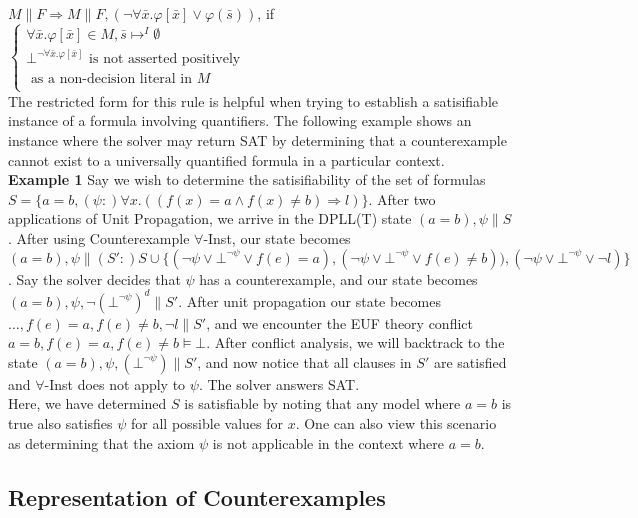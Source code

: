 \documentclass{llncs}
\begin{document}
$M \parallel F \Longrightarrow M \parallel F, (\neg \forall \bar{x}. \varphi[ \bar{ x } ] \vee \varphi( \bar{ s } ))$, if   
$\begin{cases}
  \forall \bar{x}. \varphi[ \bar{ x } ] \in M, \bar{ s } \mapsto^I \emptyset \\
  \bot^{\neg \forall \bar{x}. \varphi[ \bar{ x } ]} \text{ is not asserted positively }\\
  \text{ \ \ \ as a non-decision literal in $M$ } \\    
\end{cases}$ \\

The restricted form for this rule is helpful when trying to establish a satisifiable instance of a formula involving quantifiers.
The following example shows an instance where the solver may return SAT by determining that a counterexample cannot exist to a universally quantified formula in a particular context. \\

{\bf Example 1}
Say we wish to determine the satisifiability of the set of formulas $S = \{ a = b, (\psi :) \forall x. ((f(x) = a \wedge f(x) \neq b) \Rightarrow l) \}$.
After two applications of Unit Propagation, we arrive in the DPLL(T) state $( a = b ), \psi \parallel S$.
After using Counterexample $\forall$-Inst, our state becomes $( a = b ), \psi \parallel (S':) S \cup \{ (\neg \psi \vee \bot^{\neg \psi} \vee f( e ) = a), (\neg \psi \vee \bot^{\neg \psi} \vee f( e ) \neq b)), (\neg \psi \vee \bot^{\neg \psi} \vee \neg l) \}$.
Say the solver decides that $\psi$ has a counterexample, and our state becomes $( a = b ), \psi, \neg (\bot^{\neg \psi})^d \parallel S'$. 
After unit propagation our state becomes $\ldots, f( e ) = a, f( e ) \neq b, \neg l \parallel S'$, and we encounter the EUF theory conflict $a = b, f( e ) = a, f( e ) \neq b \models \bot$.
After conflict analysis, we will backtrack to the state $( a = b ), \psi, (\bot^{\neg \psi}) \parallel S'$, and now notice that all clauses in $S'$ are satisfied and $\forall$-Inst does not apply to $\psi$.
The solver answers SAT. \\

Here, we have determined $S$ is satisfiable by noting that any model where $a = b$ is true also satisfies $\psi$ for all possible values for $x$.
One can also view this scenario as determining that the axiom $\psi$ is not applicable in the context where $a = b$.

\subsection{Representation of Counterexamples}
\end{document}
